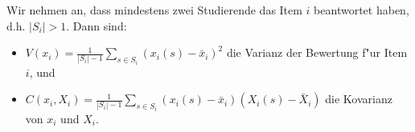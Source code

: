 \documentclass[12pt]{report}
\begin{document}
Wir nehmen an, dass mindestens zwei Studierende das Item $i$ beantwortet haben, d.h. $|S_i| > 1$.
Dann sind:
\begin{itemize}
\item $V(x_i) = \frac{1}{|S_i| - 1}\sum\limits_{s\in S_i} (x_i(s) - \bar{x}_i)^2$ die Varianz der Bewertung f"ur Item $i$, und
\item $C(x_i, X_i) = \frac{1}{|S_i| - 1}\sum\limits_{s\in S_i}(x_i(s) - \bar{x}_i)(X_i(s) - \bar{X}_i)$ die Kovarianz von $x_i$ und $X_i$.
\end{itemize}

\ \\
\end{document}
